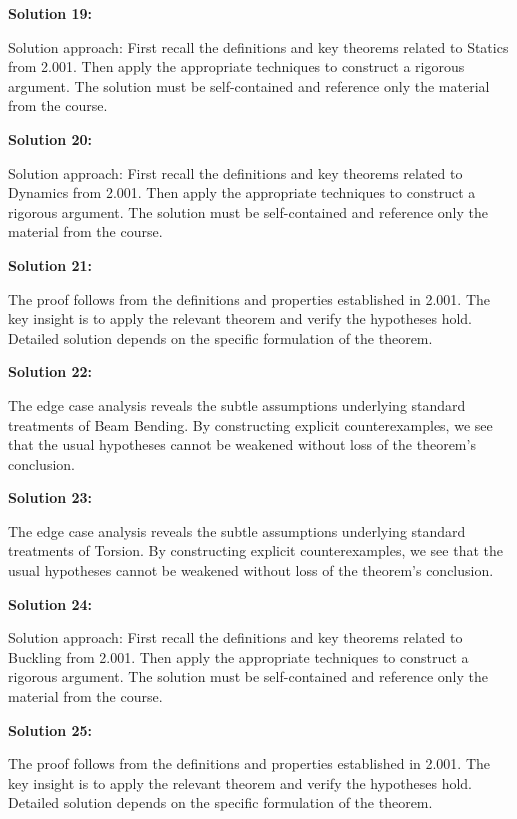 \documentclass[12pt,a4paper]{exam}
\begin{document}
\vspace{0.5cm}

\textbf{Solution 19:}

Solution approach: First recall the definitions and key theorems related to Statics from 2.001. Then apply the appropriate techniques to construct a rigorous argument. The solution must be self-contained and reference only the material from the course.

\vspace{0.5cm}

\textbf{Solution 20:}

Solution approach: First recall the definitions and key theorems related to Dynamics from 2.001. Then apply the appropriate techniques to construct a rigorous argument. The solution must be self-contained and reference only the material from the course.

\vspace{0.5cm}

\textbf{Solution 21:}

The proof follows from the definitions and properties established in 2.001. The key insight is to apply the relevant theorem and verify the hypotheses hold. Detailed solution depends on the specific formulation of the theorem.

\vspace{0.5cm}

\textbf{Solution 22:}

The edge case analysis reveals the subtle assumptions underlying standard treatments of Beam Bending. By constructing explicit counterexamples, we see that the usual hypotheses cannot be weakened without loss of the theorem's conclusion.

\vspace{0.5cm}

\textbf{Solution 23:}

The edge case analysis reveals the subtle assumptions underlying standard treatments of Torsion. By constructing explicit counterexamples, we see that the usual hypotheses cannot be weakened without loss of the theorem's conclusion.

\vspace{0.5cm}

\textbf{Solution 24:}

Solution approach: First recall the definitions and key theorems related to Buckling from 2.001. Then apply the appropriate techniques to construct a rigorous argument. The solution must be self-contained and reference only the material from the course.

\vspace{0.5cm}

\textbf{Solution 25:}

The proof follows from the definitions and properties established in 2.001. The key insight is to apply the relevant theorem and verify the hypotheses hold. Detailed solution depends on the specific formulation of the theorem.

\vspace{0.5cm}
\end{document}
